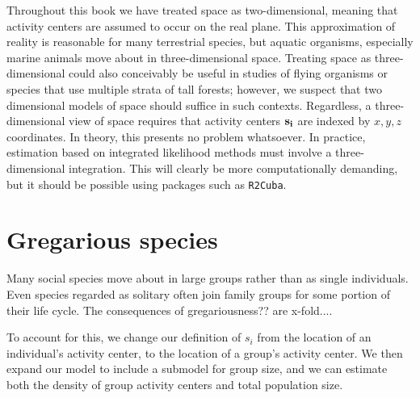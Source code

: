 Throughout this book we have treated space as
two-dimensional, meaning that activity centers are assumed to occur on
the real plane. This approximation of reality is reasonable for many
terrestrial species, but aquatic organisms, especially marine animals
move about in three-dimensional space. Treating space as
three-dimensional could also conceivably be useful in studies of flying organisms
or species that use multiple strata of tall forests; however, we
suspect that two dimensional models of space should suffice in such
contexts. Regardless, a three-dimensional view of space requires that
activity centers $\bf s_i$ are indexed by
$x,y,z$ coordinates. In theory, this presents no problem whatsoever. In
practice, estimation based on integrated likelihood methods must
involve a three-dimensional integration. This will clearly be more
computationally demanding, but it should be possible using packages
such as {\tt R2Cuba}.




\section{Gregarious species}

Many social species move about in large groups rather than as single
individuals. Even species regarded as solitary often join family
groups for some portion of their life cycle. The consequences of
gregariousness?? are x-fold....

To account for this, we change our definition of $s_i$ from the
location of an individual's activity center, to the location of a
group's activity center. We then expand our model to include a
submodel for group size, and we can estimate both the density of group
activity centers and total population size.
